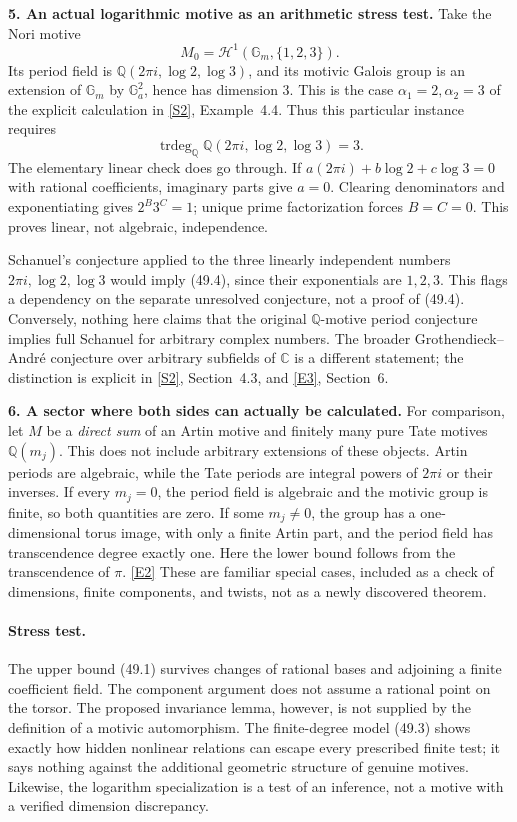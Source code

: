 \documentclass[11pt,a4paper]{article}
\newcommand{\Q}{\mathbb{Q}}
\newcommand{\C}{\mathbb{C}}
\newcommand{\sref}[2]{\hyperlink{source:#1:#2}{[S#2]}}
\newcommand{\eref}[2]{\hyperlink{extra:#1:#2}{[E#2]}}
\numberwithin{equation}{section}
\begin{document}
\textbf{5. An actual logarithmic motive as an arithmetic stress test.}
Take the Nori motive
\[
 M_0=\mathcal H^1(\mathbb G_m,\{1,2,3\}).
\]
Its period field is $\Q(2\pi i,\log2,\log3)$, and its motivic Galois
group is an extension of $\mathbb G_m$ by $\mathbb G_a^2$, hence has
dimension $3$. This is the case $\alpha_1=2,\alpha_2=3$ of the explicit
calculation in \sref{30006975}{2}, Example~4.4. Thus this particular instance
requires
\[
 \operatorname{trdeg}_{\Q}\Q(2\pi i,\log2,\log3)=3.
 \tag{49.4}
\]
The elementary linear check does go through. If
$a(2\pi i)+b\log2+c\log3=0$ with rational coefficients, imaginary parts
give $a=0$. Clearing denominators and exponentiating gives $2^B3^C=1$;
unique prime factorization forces $B=C=0$. This proves linear, not
algebraic, independence.

Schanuel's conjecture applied to the three linearly independent numbers
$2\pi i,\log2,\log3$ would imply (49.4), since their exponentials are
$1,2,3$. This flags a dependency on the separate unresolved conjecture,
not a proof of (49.4). Conversely, nothing here claims that the original
$\Q$-motive period conjecture implies full Schanuel for arbitrary complex
numbers. The broader Grothendieck--Andr\'e conjecture over arbitrary
subfields of $\C$ is a different statement; the distinction is explicit
in \sref{30006975}{2}, Section~4.3, and \eref{30006975}{3}, Section~6.

\textbf{6. A sector where both sides can actually be calculated.}
For comparison, let $M$ be a \emph{direct sum} of an Artin motive and
finitely many pure Tate motives $\Q(m_j)$. This does not include arbitrary
extensions of these objects. Artin periods are algebraic, while the Tate
periods are integral powers of $2\pi i$ or their inverses. If every
$m_j=0$, the period field is algebraic and the motivic group is finite,
so both quantities are zero. If some $m_j\ne0$, the group has a
one-dimensional torus image, with only a finite Artin part, and the period
field has transcendence degree exactly one. Here the lower bound follows
from the transcendence of $\pi$. \eref{30006975}{2}
These are familiar special cases, included as a check of dimensions,
finite components, and twists, not as a newly discovered theorem.

\paragraph{Stress test.}
The upper bound (49.1) survives changes of rational bases and adjoining a
finite coefficient field. The component argument does not assume a rational
point on the torsor. The proposed invariance lemma, however, is not supplied
by the definition of a motivic automorphism. The finite-degree model (49.3)
shows exactly how hidden nonlinear relations can escape every prescribed
finite test; it says nothing against the additional geometric structure
of genuine motives. Likewise, the logarithm specialization is a test of
an inference, not a motive with a verified dimension discrepancy.
\end{document}
